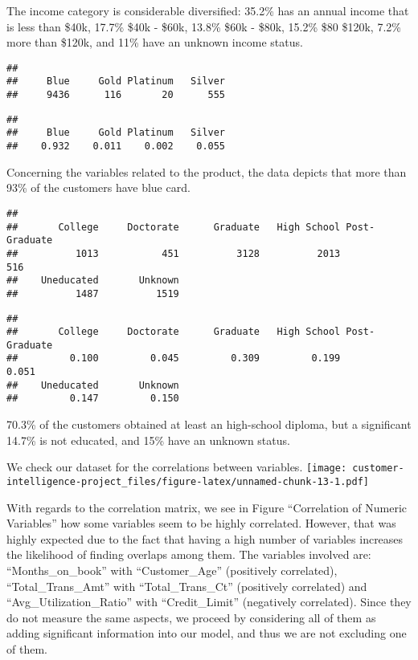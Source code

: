 \documentclass[
]{article}
\begin{document}
The income category is considerable diversified: 35.2\% has an annual
income that is less than \$40k, 17.7\% \$40k - \$60k, 13.8\% \$60k -
\$80k, 15.2\% \$80 \$120k, 7.2\% more than \$120k, and 11\% have an
unknown income status.

\begin{verbatim}
## 
##     Blue     Gold Platinum   Silver 
##     9436      116       20      555
\end{verbatim}

\begin{verbatim}
## 
##     Blue     Gold Platinum   Silver 
##    0.932    0.011    0.002    0.055
\end{verbatim}

Concerning the variables related to the product, the data depicts that
more than 93\% of the customers have blue card.

\begin{verbatim}
## 
##       College     Doctorate      Graduate   High School Post-Graduate 
##          1013           451          3128          2013           516 
##    Uneducated       Unknown 
##          1487          1519
\end{verbatim}

\begin{verbatim}
## 
##       College     Doctorate      Graduate   High School Post-Graduate 
##         0.100         0.045         0.309         0.199         0.051 
##    Uneducated       Unknown 
##         0.147         0.150
\end{verbatim}

70.3\% of the customers obtained at least an high-school diploma, but a
significant 14.7\% is not educated, and 15\% have an unknown status.

We check our dataset for the correlations between variables.
\texttt{[image: customer-intelligence-project\_files/figure-latex/unnamed-chunk-13-1.pdf]}

With regards to the correlation matrix, we see in Figure ``Correlation
of Numeric Variables'' how some variables seem to be highly correlated.
However, that was highly expected due to the fact that having a high
number of variables increases the likelihood of finding overlaps among
them. The variables involved are: ``Months\_on\_book'' with
``Customer\_Age'' (positively correlated), ``Total\_Trans\_Amt'' with
``Total\_Trans\_Ct'' (positively correlated) and
``Avg\_Utilization\_Ratio'' with ``Credit\_Limit'' (negatively
correlated). Since they do not measure the same aspects, we proceed by
considering all of them as adding significant information into our
model, and thus we are not excluding one of them.
\end{document}
